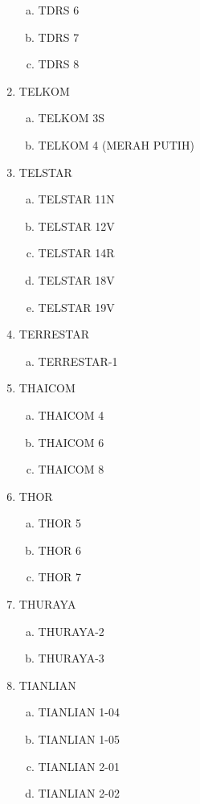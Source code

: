 \begin{multicols}{2}
\begin{enumerate}
\begin{enumerate}[a.]
    \item TDRS 6
    \item TDRS 7
    \item TDRS 8
  \end{enumerate}
  \item TELKOM
  \begin{enumerate}[a.]
    \item TELKOM 3S
    \item TELKOM 4 (MERAH PUTIH)
  \end{enumerate}
  \item TELSTAR
  \begin{enumerate}[a.]
    \item TELSTAR 11N
    \item TELSTAR 12V
    \item TELSTAR 14R
    \item TELSTAR 18V
    \item TELSTAR 19V
  \end{enumerate}
  \item TERRESTAR
  \begin{enumerate}[a.]
    \item TERRESTAR-1
  \end{enumerate}
  \item THAICOM
  \begin{enumerate}[a.]
    \item THAICOM 4
    \item THAICOM 6
    \item THAICOM 8
  \end{enumerate}
  \item THOR
  \begin{enumerate}[a.]
    \item THOR 5
    \item THOR 6
    \item THOR 7
  \end{enumerate}
  \item THURAYA
  \begin{enumerate}[a.]
    \item THURAYA-2
    \item THURAYA-3
  \end{enumerate}
  \item TIANLIAN
  \begin{enumerate}[a.]
    \item TIANLIAN 1-04
    \item TIANLIAN 1-05
    \item TIANLIAN 2-01
    \item TIANLIAN 2-02

\end{enumerate}
\end{enumerate}
\end{multicols}
